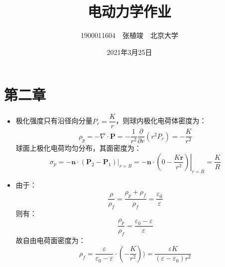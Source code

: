 \documentclass[a4paper,fontset=none]{ctexart}
\begin{document}
    \title{\textbf{电动力学作业}}
    \author{1900011604\ \ 张植竣\ \ 北京大学}
    \date{2021年3月25日}
    \maketitle

    \section*{第二章}

    \begin{itemize}

        \item[1.(1)]
        极化强度只有沿径向分量$P_r=\dfrac{K}{r}$，则球内极化电荷体密度为：
        \[
        \rho_p = -\nabla\cdot\bm{P} = -\frac{1}{r^2}\frac{\partial}{\partial r}\left(r^2P_r\right) = -\frac{K}{r^2}
        \]
        球面上极化电荷均匀分布，其面密度为：
        \[
        \sigma_p = \left.-\bm{n}\cdot\left(\bm{P}_2 - \bm{P}_1\right)\right|_{r=R} = \left.-\bm{n}\cdot\left(0 - \frac{K\bm{r}}{r^2}\right)\right|_{r=R} = \frac{K}{R}
        \]

        \item[1.(2)]
        由于：
        \[
        \frac{\rho}{\rho_f} = \frac{\rho_p+\rho_f}{\rho_f} = \frac{\varepsilon_0}{\varepsilon}
        \]
        则有：
        \[
        \frac{\rho_p}{\rho_f} = \frac{\varepsilon_0-\varepsilon}{\varepsilon}
        \]
        故自由电荷面密度为：
        \[
        \rho_f = \frac{\varepsilon}{\varepsilon_0-\varepsilon}\cdot\left(-\frac{K}{r^2}\right)) = \frac{\varepsilon K}{(\varepsilon-\varepsilon_0)r^2}
        \]


\end{itemize}
\end{document}
